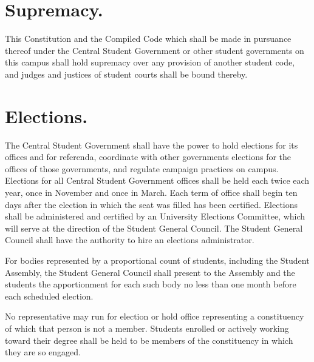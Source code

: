 \section{Supremacy.}
    This Constitution and the Compiled Code which shall be made in pursuance thereof under the Central Student Government or other student governments on this campus shall hold supremacy over any provision of another student code, and judges and justices of student courts shall be bound thereby.


\section{Elections.}
    The Central Student Government shall have the power to hold elections for its offices and for referenda, coordinate with other governments elections for the offices of those governments, and regulate campaign practices on campus. Elections for all Central Student Government offices shall be held each twice each year, once in November and once in March. Each term of office shall begin ten days after the election in which the seat was filled has been certified. Elections shall be administered and certified by an University Elections Committee, which will serve at the direction of the Student General Council. The Student General Council shall have the authority to hire an elections administrator.

    For bodies represented by a proportional count of students, including the Student Assembly, the Student General Council shall present to the Assembly and the students the apportionment for each such body no less than one month before each scheduled election.

    No representative may run for election or hold office representing a constituency of which that person is not a member. Students enrolled or actively working toward their degree shall be held to be members of the constituency in which they are so engaged.